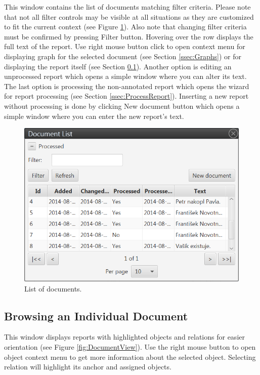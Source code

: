 This window contains the list of documents matching filter criteria. Please note
that not all filter controls may be visible at all situations as they are
customized to fit the current context (see Figure \ref{fig:DocumentList}).
Also note that changing filter criteria must be confirmed by pressing Filter
button. Hovering over the row displays the full text of the report. Use right mouse button
click to open context menu for displaying graph for the selected document (see
Section \ref{ssec:Graphs}) or for displaying the report itself (see Section
\ref{sssec:DocumentView}). Another option is editing an unprocessed report
which opens a simple window where you can alter its text. The last option is
processing the non-annotated report which opens the wizard for report processing
(see Section \ref{ssec:ProcessReport}). Inserting a new report without
processing is done by clicking New document button which opens a simple window
where you can enter the new report's text.

\begin{figure}[!htb]
        \centering
        \includegraphics[width=\textwidth]{Images/documentlist}
        \caption{List of documents.}
        \label{fig:DocumentList}
\end{figure}

\subsection{Browsing an Individual Document}
\label{sssec:DocumentView}

This window displays reports with highlighted objects and relations for easier
orientation (see Figure \ref{fig:DocumentView}). Use the right mouse button to open
object context menu to get more information about the selected object. Selecting
relation will highlight its anchor and assigned objects.

